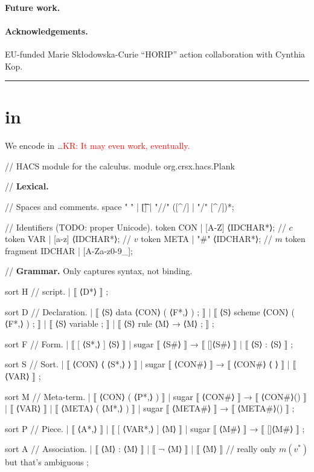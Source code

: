 \documentclass[letterpaper,11pt]{article}
\newcommand{\KR}[1]{\textcolor{red}{KR: #1}}
\begin{document}
\paragraph*{Future work.} 


\paragraph*{Acknowledgements.} 

EU-funded Marie Skłodowska-Curie ``HORIP'' action collaboration with Cynthia Kop.






\hrule
\vspace*{1pc}

\appendix

\section{\bhax in \HAX}

We encode \hax in \HAX…\KR{It may even work, eventually.}
%
\begin{hacs}[numbers=right,texcl]
// HACS module for the \hax calculus.
module org.crsx.hacs.Plank {

// \textbf{Lexical.}

// Spaces and comments.
space " " | [\t\n] | "//" ([^/\n] | "/" [^/\n])*;

// Identifiers (TODO: proper Unicode).
token CON   | [A-Z] ⟨IDCHAR*⟩;   // $c$
token VAR   | [a-z] ⟨IDCHAR*⟩;    // $v$
token META  | "#" ⟨IDCHAR*⟩;     // $m$
token fragment IDCHAR | [A-Za-z0-9_];

// \textbf{Grammar.} Only captures syntax, not binding.

sort H // \hax script.
| ⟦ ⟨D*⟩ ⟧
;

sort D // Declaration.
| ⟦ ⟨S⟩ data ⟨CON⟩ ( ⟨F*,⟩ ) ; ⟧
| ⟦ ⟨S⟩ scheme ⟨CON⟩ ( ⟨F*,⟩ ) ; ⟧
| ⟦ ⟨S⟩ variable ; ⟧
| ⟦ ⟨S⟩ rule ⟨M⟩ → ⟨M⟩ ; ⟧
;

sort F // Form.
| ⟦ [ ⟨S*,⟩ ] ⟨S⟩ ⟧  | sugar ⟦ ⟨S#⟩ ⟧ → ⟦ []⟨S#⟩ ⟧
| ⟦ { ⟨S⟩ : ⟨S⟩ } ⟧
;


sort S // Sort.
| ⟦ ⟨CON⟩ ⟨ ⟨S*,⟩ ⟩ ⟧  | sugar ⟦ ⟨CON#⟩ ⟧ → ⟦ ⟨CON#⟩ ⟨ ⟩ ⟧
| ⟦ ⟨VAR⟩ ⟧
;

sort M // Meta-term.
| ⟦ ⟨CON⟩ ( ⟨P*,⟩ ) ⟧  | sugar ⟦ ⟨CON#⟩ ⟧ → ⟦ ⟨CON#⟩() ⟧
| ⟦ ⟨VAR⟩ ⟧
| ⟦ ⟨META⟩ ( ⟨M*,⟩ ) ⟧  | sugar ⟦ ⟨META#⟩ ⟧ → ⟦ ⟨META#⟩() ⟧
;

sort P // Piece.
| ⟦ { ⟨A*,⟩ } ⟧
| ⟦ [ ⟨VAR*,⟩ ] ⟨M⟩ ⟧   | sugar ⟦ ⟨M#⟩ ⟧ → ⟦ []⟨M#⟩ ⟧
;

sort A // Association.
| ⟦ ⟨M⟩ : ⟨M⟩ ⟧
| ⟦ ¬ ⟨M⟩ ⟧
| ⟦ ⟨M⟩ ⟧  // really only $m(v^*)$ but that's ambiguous
;

}
\end{hacs}
\end{document}
